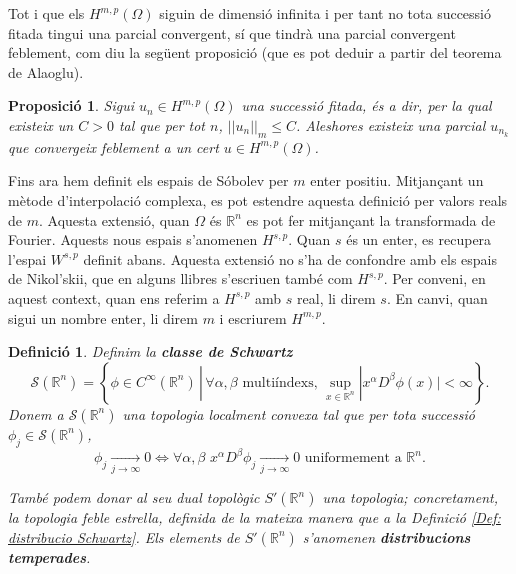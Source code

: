 \documentclass{article}
\numberwithin{equation}{section}
\newtheorem{definicio}{Definici\'{o}}[section]
\newtheorem{proposicio}{Proposici\'{o}}[section]
\begin{document}
Tot i que els $H^{m,p}(\Omega)$ siguin de dimensi\'{o} infinita i per tant no tota successi\'{o} fitada tingui una parcial convergent, s\'{i} que tindr\`{a} una parcial convergent feblement, com diu la seg\"{u}ent proposici\'{o} (que es pot deduir a partir del teorema de Alaoglu).

\begin{proposicio}\label{Pro: Alaoglu}
Sigui $u_n\in H^{m,p}(\Omega)$ una successi\'{o} fitada, \'{e}s a dir, per la qual existeix un $C>0$ tal que per tot $n$, $||u_n||_m\leq C$. Aleshores existeix una parcial $u_{n_k}$ que convergeix feblement a un cert $u\in H^{m,p}(\Omega)$.
\end{proposicio}
\vspace{3mm}

Fins ara hem definit els espais de S\'{o}bolev per $m$ enter positiu. Mitjan\c{c}ant un m\`{e}tode d'interpolaci\'{o} complexa, es pot estendre aquesta definici\'{o} per valors reals de $m$. Aquesta extensi\'{o}, quan $\Omega$ \'{e}s $\mathbb{R}^n$ es pot fer mitjan\c{c}ant la transformada de Fourier. Aquests nous espais s'anomenen $H^{s,p}$. Quan $s$ \'{e}s un enter, es recupera l'espai $W^{s,p}$ definit abans. Aquesta extensi\'{o} no s'ha de confondre amb els espais de Nikol'skii, que en alguns llibres s'escriuen tamb\'{e} com $H^{s,p}$. Per conveni, en aquest context, quan ens referim a $H^{s,p}$ amb $s$ real, li direm $s$. En canvi, quan sigui un nombre enter, li direm $m$ i escriurem $H^{m,p}$.

\begin{definicio}
Definim la \textbf{classe de Schwartz}
\begin{equation}
\mathcal{S}(\mathbb{R}^n)=\left\{\phi\in C^{\infty}(\mathbb{R}^n)\,|\,\forall\alpha,\beta\text{ multi\'{i}ndexs, }\sup_{x\in\mathbb{R}^n}|x^{\alpha}D^{\beta}\phi(x)|<\infty\right\}.
\end{equation}
Donem a $\mathcal{S}(\mathbb{R}^n)$ una topologia localment convexa tal que per tota successi\'{o} $\phi_j\in\mathcal{S}(\mathbb{R}^n)$,
\[\phi_j\xrightarrow[j\to\infty]{}0\Longleftrightarrow\forall\alpha,\beta\,\,x^{\alpha}D^{\beta}\phi_j\xrightarrow[j\to\infty]{}0\text{ uniformement a }\mathbb{R}^n.\]

Tamb\'{e} podem donar al seu dual topol\`{o}gic $S'(\mathbb{R}^n)$ una topologia; concretament, la topologia feble estrella, definida de la mateixa manera que a la Definici\'{o} \ref{Def: distribucio Schwartz}. Els elements de $S'(\mathbb{R}^n)$ s'anomenen \textbf{distribucions temperades}.
\end{definicio}
\end{document}
